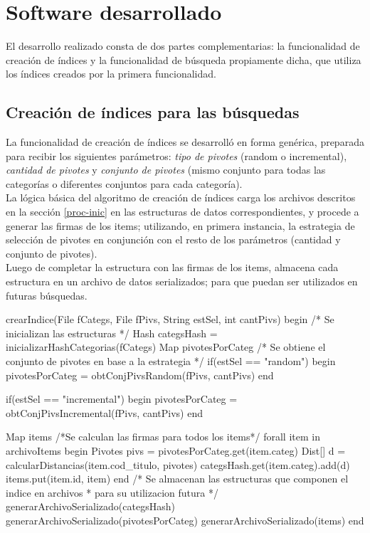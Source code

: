 \section{Software desarrollado}

El desarrollo realizado consta de dos partes complementarias: la funcionalidad de creaci\'on de \'indices y la funcionalidad de b\'usqueda propiamente dicha, que utiliza los \'indices creados por la primera funcionalidad.\\

\subsection{Creaci\'on de \'indices para las b\'usquedas}

La funcionalidad de creaci\'on de \'indices se desarroll\'o en forma gen\'erica, preparada para recibir los siguientes par\'ametros: \textit{tipo de pivotes} (random o incremental), \textit{cantidad de pivotes} y \textit{conjunto de pivotes} (mismo conjunto para todas las categor\'ias o diferentes conjuntos para cada categor\'ia).\\

La l\'ogica b\'asica del algoritmo de creaci\'on de \'indices carga los archivos descritos en la secci\'on  \ref{proc-inic} en las estructuras de datos correspondientes, y procede a generar las firmas de los items; utilizando, en primera instancia, la estrategia de selecci\'on de pivotes en conjunci\'on con el resto de los par\'ametros (cantidad y conjunto de pivotes).\\

Luego de completar la estructura con las firmas de los items, almacena cada estructura en un archivo de datos serializados; para que puedan ser utilizados en futuras b\'usquedas.\\

\begin{algorithm}[caption={Creaci\'on de \'indice}, label={alg1}]
crearIndice(File fCategs, File fPivs, String estSel, int cantPivs)
begin
 /* Se inicializan las estructuras */
 Hash categsHash = inicializarHashCategorias(fCategs)
 Map pivotesPorCateg
 /* Se obtiene el conjunto de pivotes en base a la estrategia */
 if(estSel == "random")
 begin
  pivotesPorCateg = obtConjPivsRandom(fPivs, cantPivs)
 end

 if(estSel == "incremental")
 begin
  pivotesPorCateg = obtConjPivsIncremental(fPivs, cantPivs)
 end

 Map items
 /*Se calculan las firmas para todos los items*/
 forall item in archivoItems
 begin
  Pivotes pivs = pivotesPorCateg.get(item.categ)
  Dist[] d = calcularDistancias(item.cod_titulo, pivotes)
  categsHash.get(item.categ).add(d)
  items.put(item.id, item)
 end
 /* Se almacenan las estructuras que componen el indice en archivos 
  * para su utilizacion futura */
 generarArchivoSerializado(categsHash)
 generarArchivoSerializado(pivotesPorCateg)
 generarArchivoSerializado(items)
end
\end{algorithm}

